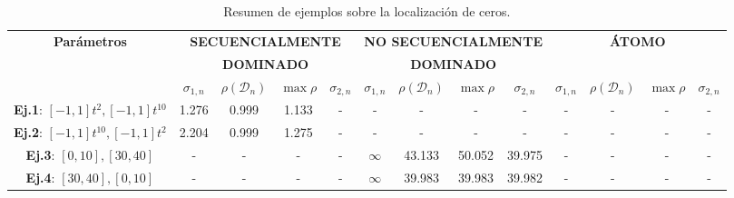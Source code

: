 \begin{table}
	\centering
	\small
	\caption{Resumen de ejemplos sobre la localización de ceros.}
	\begin{tabular}{|c|cccc|cccc|cccc|}
		\hline
		\multirow{3}{*}{\textbf{Parámetros}}       & \multicolumn{4}{c|}{\textbf{SECUENCIALMENTE}} & \multicolumn{4}{c|}{\textbf{NO SECUENCIALMENTE}} & \multicolumn{4}{c|}{\textbf{ÁTOMO}}                                                                                                                                                                    \\
		                                           & \multicolumn{4}{c|}{\textbf{DOMINADO}}        & \multicolumn{4}{c|}{\textbf{DOMINADO}}           & \multicolumn{4}{c|}{}                                                                                                                                                                                  \\
		\cline{2-13}
		                                           & $\sigma_{1,n}$                                & $\rho(\mathcal{D}_{n})$                          & $\max\rho$                          & $\sigma_{2,n}$ & $\sigma_{1,n}$ & $\rho(\mathcal{D}_{n})$ & $\max\rho$ & $\sigma_{2,n}$ & $\sigma_{1,n}$ & $\rho(\mathcal{D}_{n})$ & $\max\rho$ & $\sigma_{2,n}$ \\
		\hline
		\textbf{Ej.1}: $[-1,1]t^2, [-1,1]t^{10}$   & 1.276                                         & 0.999                                            & 1.133                               & -              & -              & -                       & -          & -              & -              & -                       & -          & -              \\
		\textbf{Ej.2}: $[-1,1]t^{10}, [-1,1]t^{2}$ & 2.204                                         & 0.999                                            & 1.275                               & -              & -              & -                       & -          & -              & -              & -                       & -          & -              \\
		\textbf{Ej.3}: $[0,10], [30,40]$           & -                                             & -                                                & -                                   & -              & $\infty$       & 43.133                  & 50.052     & 39.975         & -              & -                       & -          & -              \\
		\textbf{Ej.4}: $[30,40], [0,10]$           & -                                             & -                                                & -                                   & -              & $\infty$       & 39.983                  & 39.983     & 39.982         & -              & -                       & -          & -              \\

\end{tabular}
\end{table}
